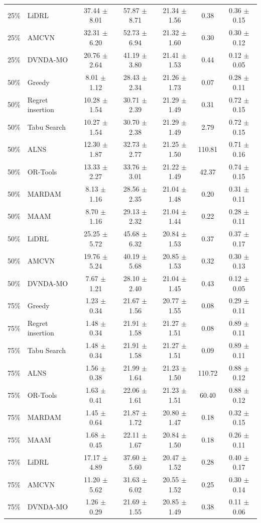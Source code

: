 \begin{tabular}{clccccc}
25\% & LiDRL & 37.44 $\pm$ 8.01 & 57.87 $\pm$ 8.71 & 21.34 $\pm$ 1.56 & 0.38 & 0.36 $\pm$ 0.15 \\
25\% & AMCVN & 32.31 $\pm$ 6.20 & 52.73 $\pm$ 6.94 & 21.32 $\pm$ 1.60 & 0.30 & 0.30 $\pm$ 0.12 \\
25\% & DVNDA-MO & 20.76 $\pm$ 2.64 & 41.19 $\pm$ 3.80 & 21.41 $\pm$ 1.53 & 0.44 & 0.12 $\pm$ 0.05 \\
50\% & Greedy & 8.01 $\pm$ 1.12 & 28.43 $\pm$ 2.34 & 21.26 $\pm$ 1.73 & 0.07 & 0.28 $\pm$ 0.11 \\
50\% & Regret insertion & 10.28 $\pm$ 1.54 & 30.71 $\pm$ 2.39 & 21.29 $\pm$ 1.49 & 0.31 & 0.72 $\pm$ 0.15 \\
50\% & Tabu Search & 10.27 $\pm$ 1.54 & 30.70 $\pm$ 2.38 & 21.29 $\pm$ 1.49 & 2.79 & 0.72 $\pm$ 0.15 \\
50\% & ALNS & 12.30 $\pm$ 1.87 & 32.73 $\pm$ 2.77 & 21.25 $\pm$ 1.50 & 110.81 & 0.71 $\pm$ 0.16 \\
50\% & OR-Tools & 13.33 $\pm$ 2.27 & 33.76 $\pm$ 3.01 & 21.22 $\pm$ 1.49 & 42.37 & 0.74 $\pm$ 0.15 \\
50\% & MARDAM & 8.13 $\pm$ 1.16 & 28.56 $\pm$ 2.35 & 21.04 $\pm$ 1.48 & 0.20 & 0.31 $\pm$ 0.11 \\
50\% & MAAM & 8.70 $\pm$ 1.16 & 29.13 $\pm$ 2.32 & 21.04 $\pm$ 1.44 & 0.22 & 0.28 $\pm$ 0.11 \\
50\% & LiDRL & 25.25 $\pm$ 5.72 & 45.68 $\pm$ 6.32 & 20.84 $\pm$ 1.53 & 0.37 & 0.37 $\pm$ 0.17 \\
50\% & AMCVN & 19.76 $\pm$ 5.24 & 40.19 $\pm$ 5.68 & 20.85 $\pm$ 1.53 & 0.32 & 0.30 $\pm$ 0.13 \\
50\% & DVNDA-MO & 7.67 $\pm$ 1.21 & 28.10 $\pm$ 2.40 & 21.04 $\pm$ 1.45 & 0.43 & 0.12 $\pm$ 0.05 \\
75\% & Greedy & 1.23 $\pm$ 0.34 & 21.67 $\pm$ 1.56 & 20.77 $\pm$ 1.55 & 0.08 & 0.29 $\pm$ 0.11 \\
75\% & Regret insertion & 1.48 $\pm$ 0.34 & 21.91 $\pm$ 1.58 & 21.27 $\pm$ 1.51 & 0.08 & 0.89 $\pm$ 0.11 \\
75\% & Tabu Search & 1.48 $\pm$ 0.34 & 21.91 $\pm$ 1.58 & 21.27 $\pm$ 1.51 & 0.09 & 0.89 $\pm$ 0.11 \\
75\% & ALNS & 1.56 $\pm$ 0.38 & 21.99 $\pm$ 1.64 & 21.23 $\pm$ 1.50 & 110.72 & 0.88 $\pm$ 0.12 \\
75\% & OR-Tools & 1.63 $\pm$ 0.41 & 22.06 $\pm$ 1.61 & 21.23 $\pm$ 1.51 & 60.40 & 0.88 $\pm$ 0.12 \\
75\% & MARDAM & 1.45 $\pm$ 0.64 & 21.87 $\pm$ 1.72 & 20.80 $\pm$ 1.47 & 0.18 & 0.32 $\pm$ 0.15 \\
75\% & MAAM & 1.68 $\pm$ 0.45 & 22.11 $\pm$ 1.67 & 20.84 $\pm$ 1.50 & 0.18 & 0.26 $\pm$ 0.11 \\
75\% & LiDRL & 17.17 $\pm$ 4.89 & 37.60 $\pm$ 5.60 & 20.47 $\pm$ 1.52 & 0.28 & 0.40 $\pm$ 0.17 \\
75\% & AMCVN & 11.20 $\pm$ 5.62 & 31.63 $\pm$ 6.02 & 20.55 $\pm$ 1.52 & 0.25 & 0.30 $\pm$ 0.14 \\
75\% & DVNDA-MO & 1.26 $\pm$ 0.29 & 21.69 $\pm$ 1.55 & 20.85 $\pm$ 1.49 & 0.38 & 0.11 $\pm$ 0.06 \\
\bottomrule
\end{tabular}
